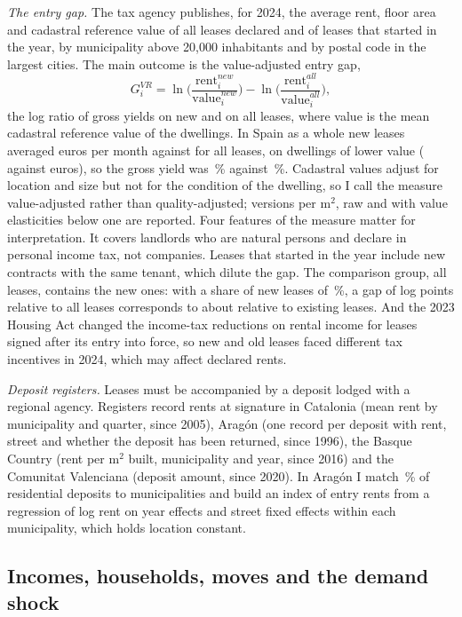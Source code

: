 \documentclass[11pt,a4paper]{article}
\begin{document}
\textit{The entry gap.} The tax agency publishes, for 2024, the average rent, floor area and cadastral reference value of all leases declared and of leases that started in the year, by municipality above 20,000 inhabitants and by postal code in the largest cities. The main outcome is the value-adjusted entry gap,
\[
G^{VR}_i=\ln\!\Big(\frac{\text{rent}^{new}_i}{\text{value}^{new}_i}\Big)-\ln\!\Big(\frac{\text{rent}^{all}_i}{\text{value}^{all}_i}\Big),
\]
the log ratio of gross yields on new and on all leases, where value is the mean cadastral reference value of the dwellings. In Spain as a whole new leases averaged \aeatRentNew{} euros per month against \aeatRent{} for all leases, on dwellings of lower value (\aeatVrNew{} against \aeatVr{} euros), so the gross yield was \aeatYldNew\,\% against \aeatYld\,\%. Cadastral values adjust for location and size but not for the condition of the dwelling, so I call the measure value-adjusted rather than quality-adjusted; versions per m$^2$, raw and with value elasticities below one are reported. Four features of the measure matter for interpretation. It covers landlords who are natural persons and declare in personal income tax, not companies. Leases that started in the year include new contracts with the same tenant, which dilute the gap. The comparison group, all leases, contains the new ones: with a share of new leases of \wNewFour\,\%, a gap of \gapVr{} log points relative to all leases corresponds to about \gapExist{} relative to existing leases. And the 2023 Housing Act changed the income-tax reductions on rental income for leases signed after its entry into force, so new and old leases faced different tax incentives in 2024, which may affect declared rents.

\textit{Deposit registers.} Leases must be accompanied by a deposit lodged with a regional agency. Registers record rents at signature in Catalonia (mean rent by municipality and quarter, since 2005), Aragón (one record per deposit with rent, street and whether the deposit has been returned, since 1996), the Basque Country (rent per m$^2$ built, municipality and year, since 2016) and the Comunitat Valenciana (deposit amount, since 2020). In Aragón I match \araMatch\,\% of residential deposits to municipalities and build an index of entry rents from a regression of log rent on year effects and street fixed effects within each municipality, which holds location constant.

\subsection{Incomes, households, moves and the demand shock}
\end{document}
